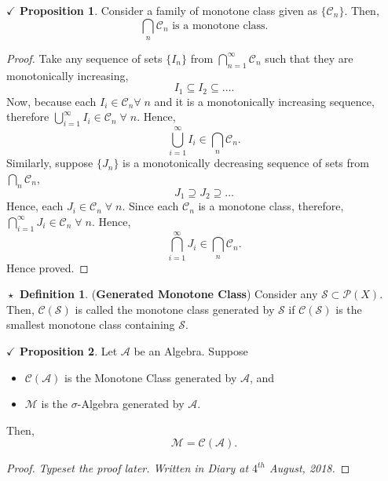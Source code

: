 \documentclass{article}
\theoremstyle{definition}
\newtheorem{definition}{$\boxed{\star}$ Definition}
\theoremstyle{remark}
\theoremstyle{definition}
\theoremstyle{definition}
\newtheorem{proposition}{$\checkmark$ Proposition}
\theoremstyle{definition}
\newcommand{\bunion}{\bigcup}
\newcommand{\bintrs}{\bigcap}
\newcommand{\alg}[1]{\mathscr{#1}}
\newcommand{\pow}[1]{\mathscr{P}\left (#1\right )}
\begin{document}
\hrulefill
\newpage
\begin{proposition}
	Consider a family of monotone class given as $ \{\alg{C}_n\} $. Then,
	\[\bintrs_{n} \alg{C}_n \text{ is a monotone class.}\]
\end{proposition}
\begin{proof}
	Take any sequence of sets $ \{I_n\} $ from $ \bintrs_{n=1}^{\infty}  \alg{C}_n $ such that they are monotonically increasing,
	\[I_1\subseteq I_2 \subseteq \dots.\]
	Now, because each $ I_i \in \alg{C}_n \forall \; n$ and it is a monotonically increasing sequence, therefore $ \bunion_{i=1}^{\infty} I_i \in \alg{C}_n\;\forall\;n$. Hence,
	\[\bunion_{i=1}^{\infty} I_i \in \bintrs_{n}\alg{C}_n.\]
	Similarly, suppose $ \{J_n\} $ is a monotonically decreasing sequence of sets from $ \bintrs_{n}\alg{C}_n $,
	\[J_1\supseteq J_2 \supseteq \dots\]
	Hence, each $ J_i \in \alg{C}_n \;\forall\;n$. Since each $ \alg{C}_n $ is a monotone class, therefore, $ \bintrs_{i=1}^{\infty} J_i \in \alg{C}_n \;\forall\;n$. Hence,
	\[\bintrs_{i=1}^{\infty} J_i \in \bintrs_{n}\alg{C}_n.\]
	Hence proved.
\end{proof}
\hrulefill
\begin{definition}
	(\textbf{Generated Monotone Class}) Consider any $ \alg{S} \subset \pow{X} $. Then, $ \alg{C}(\alg{S}) $ is called the monotone class generated by $ \alg{S} $ if $ \alg{C}(\alg{S}) $ is the smallest monotone class containing $ \alg{S} $.
\end{definition}
\hrulefill
\begin{proposition}
	Let $ \alg{A} $ be an Algebra. Suppose 
	\begin{itemize}
		\item {$ \alg{C}(\alg{A}) $ is the Monotone Class generated by $ \alg{A} $, and}
		\item {$ \alg{M} $ is the $ \sigma $-Algebra generated by $ \alg{A} $.} 
	\end{itemize}
Then,
\[\alg{M} =  \alg{C}(\alg{A}).\]
\end{proposition}
\begin{proof}
	\emph{Typeset the proof later. Written in Diary at $ 4^{th} $ August, 2018.}
\end{proof}
\hrulefill
\newpage
\end{document}
